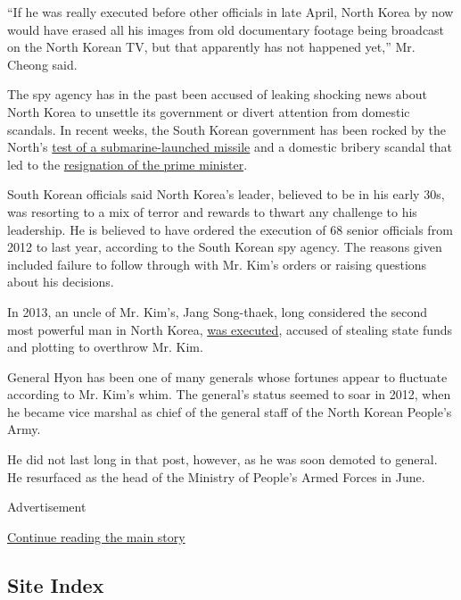 ``If he was really executed before other officials in late April, North
Korea by now would have erased all his images from old documentary
footage being broadcast on the North Korean TV, but that apparently has
not happened yet,'' Mr. Cheong said.

The spy agency has in the past been accused of leaking shocking news
about North Korea to unsettle its government or divert attention from
domestic scandals. In recent weeks, the South Korean government has been
rocked by the North's
\href{http://www.nytimes.com/2015/05/09/world/asia/north-korea-says-it-test-fired-missile-from-submarine.html}{test
of a submarine-launched missile} and a domestic bribery scandal that led
to the
\href{http://www.nytimes.com/2015/04/21/world/asia/south-korean-premier-offers-his-resignation.html}{resignation
of the prime minister}.

South Korean officials said North Korea's leader, believed to be in his
early 30s, was resorting to a mix of terror and rewards to thwart any
challenge to his leadership. He is believed to have ordered the
execution of 68 senior officials from 2012 to last year, according to
the South Korean spy agency. The reasons given included failure to
follow through with Mr. Kim's orders or raising questions about his
decisions.

In 2013, an uncle of Mr. Kim's, Jang Song-thaek, long considered the
second most powerful man in North Korea,
\href{http://www.nytimes.com/2013/12/13/world/asia/north-korea-says-uncle-of-executed.html}{was
executed}, accused of stealing state funds and plotting to overthrow Mr.
Kim.

General Hyon has been one of many generals whose fortunes appear to
fluctuate according to Mr. Kim's whim. The general's status seemed to
soar in 2012, when he became vice marshal as chief of the general staff
of the North Korean People's Army.

He did not last long in that post, however, as he was soon demoted to
general. He resurfaced as the head of the Ministry of People's Armed
Forces in June.

Advertisement

\protect\hyperlink{after-bottom}{Continue reading the main story}

\hypertarget{site-index}{%
\subsection{Site Index}\label{site-index}}

